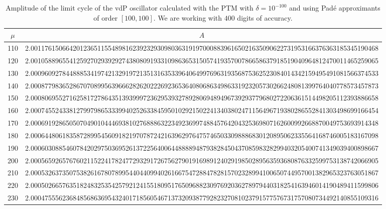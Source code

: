 \documentclass[final]{article}
\begin{document}
\begin{table}
	\caption{Amplitude of the limit cycle of the vdP oscillator calculated with the PTM with $\delta=10^{-100}$ and using Pad\'e approximants of order $[100,100]$. We are working with $400$ digits of accuracy. }
	\bigskip
	\label{table_A_vdP2}
	\begin{center}
		\begin{tabular}{|c|c|}
			\hline
			$\mu$ &   $A$    \\
			\hline
			110	&   2.001176150664201236511554898162392329309803631919700088396165021635090622731953166376363185345190468 \\ 
			120 & 	2.001058896554125927029392927438080919331098636531505741935700786658637918519040964812470011465259065 \\ 
			130 & 	2.000960927844888534197421329197213513163533964064997696319356875362523084014342159495491081566374533 \\ 
			140 & 	2.000877983652867070899563966628262022269236536408068634986331923205730266248081399764040778573457873 \\ 
			150 & 	2.000806955271625817278643513939997236295393278928069489496739293779680272206361514498205112393886658 \\ 
			160 & 	2.000745524338127997986533399402526338459501029215022413403802471156496719380286552841303498699166454 \\ 
			170 & 	2.000691928650507049010444693810276888632234923699748845764204325369807162600992668870049753693914348 \\ 
			180 & 	2.000644806183587289954560918219707872421639629764757465033098886830120895062335564168746005183167098 \\ 
			190 & 	2.000603088546078420297503695261372256400644888894879382845043708598328299403205400741349039400898667 \\ 
			200 & 	2.000565926576760211522417824772932917267562790191698912402919850289563593680876332599753138742066905 \\ 
			210 & 	2.000532637350753826167807899544044099402616675472884782815702328994100650744957001382965323763051867 \\ 
			220 & 	2.000502665763518248325354257921241551809517650968823097692036278979440318254163946014190489411599806 \\ 
			230 & 	2.000475556236848568636954324017185605467137320938779282327081023791577576731757080734492140855109316 \\ 

\end{tabular}
\end{center}
\end{table}
\end{document}
